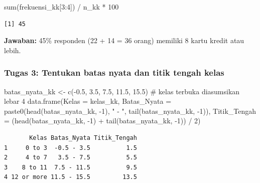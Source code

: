 \documentclass[
  indonesian,
  letterpaper,
]{book}
\newenvironment{Shaded}{\begin{snugshade}}{\end{snugshade}}
\newcommand{\AttributeTok}[1]{\textcolor[rgb]{0.40,0.45,0.13}{#1}}
\newcommand{\CommentTok}[1]{\textcolor[rgb]{0.37,0.37,0.37}{#1}}
\newcommand{\DecValTok}[1]{\textcolor[rgb]{0.68,0.00,0.00}{#1}}
\newcommand{\FloatTok}[1]{\textcolor[rgb]{0.68,0.00,0.00}{#1}}
\newcommand{\FunctionTok}[1]{\textcolor[rgb]{0.28,0.35,0.67}{#1}}
\newcommand{\NormalTok}[1]{\textcolor[rgb]{0.00,0.23,0.31}{#1}}
\newcommand{\OtherTok}[1]{\textcolor[rgb]{0.00,0.23,0.31}{#1}}
\newcommand{\SpecialCharTok}[1]{\textcolor[rgb]{0.37,0.37,0.37}{#1}}
\newcommand{\StringTok}[1]{\textcolor[rgb]{0.13,0.47,0.30}{#1}}
\begin{document}
\begin{Shaded}
\begin{Highlighting}[]
\FunctionTok{sum}\NormalTok{(frekuensi\_kk[}\DecValTok{3}\SpecialCharTok{:}\DecValTok{4}\NormalTok{]) }\SpecialCharTok{/}\NormalTok{ n\_kk }\SpecialCharTok{*} \DecValTok{100}
\end{Highlighting}
\end{Shaded}

\begin{verbatim}
[1] 45
\end{verbatim}

\textbf{Jawaban:} 45\% responden (22 + 14 = 36 orang) memiliki 8 kartu
kredit atau lebih.

\subsubsection{Tugas 3: Tentukan batas nyata dan titik tengah
kelas}\label{tugas-3-tentukan-batas-nyata-dan-titik-tengah-kelas}

\begin{Shaded}
\begin{Highlighting}[]
\NormalTok{batas\_nyata\_kk }\OtherTok{\textless{}{-}} \FunctionTok{c}\NormalTok{(}\SpecialCharTok{{-}}\FloatTok{0.5}\NormalTok{, }\FloatTok{3.5}\NormalTok{, }\FloatTok{7.5}\NormalTok{, }\FloatTok{11.5}\NormalTok{, }\FloatTok{15.5}\NormalTok{) }\CommentTok{\# kelas terbuka diasumsikan lebar 4}
\FunctionTok{data.frame}\NormalTok{(}\AttributeTok{Kelas =}\NormalTok{ kelas\_kk,}
\AttributeTok{Batas\_Nyata =} \FunctionTok{paste0}\NormalTok{(}\FunctionTok{head}\NormalTok{(batas\_nyata\_kk, }\SpecialCharTok{{-}}\DecValTok{1}\NormalTok{), }\StringTok{" {-} "}\NormalTok{, }\FunctionTok{tail}\NormalTok{(batas\_nyata\_kk, }\SpecialCharTok{{-}}\DecValTok{1}\NormalTok{)),}
\AttributeTok{Titik\_Tengah =}\NormalTok{ (}\FunctionTok{head}\NormalTok{(batas\_nyata\_kk, }\SpecialCharTok{{-}}\DecValTok{1}\NormalTok{) }\SpecialCharTok{+} \FunctionTok{tail}\NormalTok{(batas\_nyata\_kk, }\SpecialCharTok{{-}}\DecValTok{1}\NormalTok{)) }\SpecialCharTok{/} \DecValTok{2}\NormalTok{)}
\end{Highlighting}
\end{Shaded}

\begin{verbatim}
       Kelas Batas_Nyata Titik_Tengah
1     0 to 3  -0.5 - 3.5          1.5
2     4 to 7   3.5 - 7.5          5.5
3    8 to 11  7.5 - 11.5          9.5
4 12 or more 11.5 - 15.5         13.5
\end{verbatim}
\end{document}
